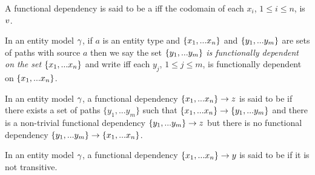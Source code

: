 \begin{definition}
A functional dependency  is said to be a  iff
 the codomain of each $x_i$, $1 \leq i \leq n$, is $v$.
\end{definition}

\begin{definition}
In an entity model $\gamma$, if
$a$ is an entity type and $\left\{x_1,...x_n\right\}$ and $\left\{y_1,...y_m\right\}$ are sets of paths with source $a$
then we say the set $\left\{y_1,...y_m\right\}$ \textit{is functionally dependent on the set} $\left\{x_1,...x_n\right\}$ and write
iff  each $y_j$, $1 \leq j \leq m$, is functionally dependent on $\left\{x_1,...x_n\right\}$.
\end{definition}
\begin{definition} %
In an entity model $\gamma$, a functional dependency $\left\{x_1,...x_n\right\} \rightarrow z$
is said to be  if there exists a set of paths $\{y_1,...y_{m}\}$ such that
$\left\{x_1,...x_n\right\} \rightarrow \left\{y_1,...y_{m}\right\}$ and there is a non-trivial functional
dependency $\left\{y_1,...y_{m}\right\} \rightarrow z$ but there is no functional dependency 
$\{y_1,...y_{m}\} \rightarrow \{x_1,...x_n\}$.
\end{definition}
\begin{definition} %
In an entity model $\gamma$, a functional dependency $\left\{x_1,...x_n\right\} \rightarrow y$
is said to be  if it is not transitive.
\end{definition} 

